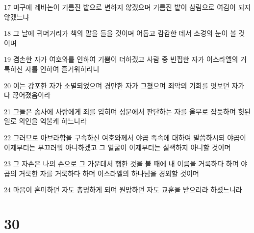 \par 17 미구에 레바논이 기름진 밭으로 변하지 않겠으며 기름진 밭이 삼림으로 여김이 되지 않겠느냐
\par 18 그 날에 귀머거리가 책의 말을 들을 것이며 어둡고 캄캄한 데서 소경의 눈이 볼 것이며
\par 19 겸손한 자가 여호와를 인하여 기쁨이 더하겠고 사람 중 빈핍한 자가 이스라엘의 거룩하신 자를 인하여 즐거워하리니
\par 20 이는 강포한 자가 소멸되었으며 경만한 자가 그쳤으며 죄악의 기회를 엿보던 자가 다 끊어졌음이라
\par 21 그들은 송사에 사람에게 죄를 입히며 성문에서 판단하는 자를 올무로 잡듯하며 헛된 일로 의인을 억울케 하느니라
\par 22 그러므로 아브라함을 구속하신 여호와께서 야곱 족속에 대하여 말씀하시되 야곱이 이제부터는 부끄러워 아니하겠고 그 얼굴이 이제부터는 실색하지 아니할 것이며
\par 23 그 자손은 나의 손으로 그 가운데서 행한 것을 볼 때에 내 이름을 거룩하다 하며 야곱의 거룩한 자를 거룩하다 하며 이스라엘의 하나님을 경외할 것이며
\par 24 마음이 혼미하던 자도 총명하게 되며 원망하던 자도 교훈을 받으리라 하셨느니라

\chapter{30}

